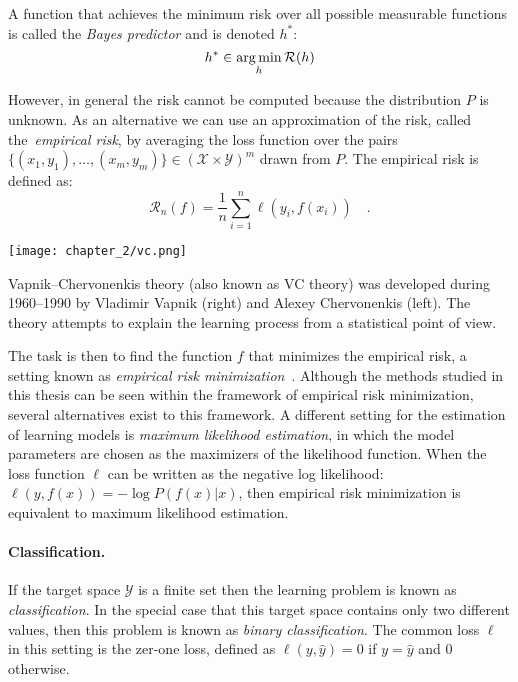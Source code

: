 A function that achieves the minimum risk over all possible measurable functions is called the \emph{Bayes predictor} and is denoted $h^*$:
$$
h^* \in \operatorname*{arg\,min}_h \mathcal{R}(h)
$$



However, in general the risk cannot be computed because the distribution $P$ is unknown. As an alternative we can use an approximation of the risk, called the~\emph{empirical risk}, by averaging the loss function over the pairs $\{(x_1, y_1), \ldots, (x_m, y_m)\} \in (\mathcal{X} \times \mathcal{Y})^m$ drawn from $P$. The empirical risk is defined as: 
\begin{equation}\label{eq:empirical_risk}
{{\mathcal{R}}_n}(f) = \frac{1}{n} \sum_{i=1}^n \ell(y_i, f(x_i)) \quad.
\end{equation}


\begin{marginfigure}
\texttt{[image: chapter\_2/vc.png]}
\caption{Vapnik–Chervonenkis theory (also known as VC theory) was developed during 1960–1990 by Vladimir Vapnik (right) and Alexey Chervonenkis (left). The theory attempts to explain the learning process from a statistical point of view.}
\end{marginfigure}

The task is then to find the function $f$ that minimizes the empirical risk, a setting known as \emph{empirical risk minimization}~\citep{vapnik1974teoriya}. Although the methods studied in this thesis can be seen within the framework of empirical risk minimization, several alternatives exist to this framework. A different setting for the estimation of learning models is \emph{maximum likelihood estimation}, in which the model parameters are chosen as the maximizers of the likelihood function. When the loss function $\ell$ can be written as the negative log likelihood: $\ell(y, f(x)) = -\log P(f(x)|x)$, then empirical risk minimization is equivalent to maximum likelihood estimation.

\paragraph{Classification.} If the target space $\mathcal{Y}$ is a finite set then the learning problem is known as \emph{classification}. In the special case that this target space contains only two different values, then this problem is known as \emph{binary classification}. The common loss $\ell$ in this setting is the zer-one loss, defined as $\ell(y, \hat{y}) = 0$ if $y = \hat{y}$ and $0$ otherwise.

